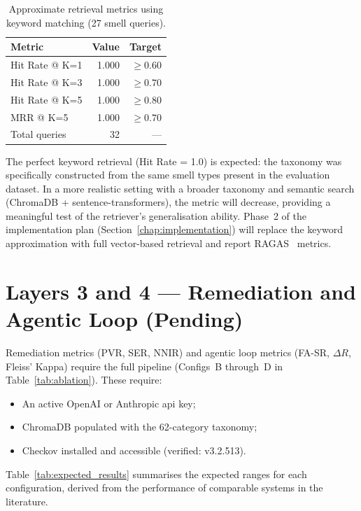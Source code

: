 \documentclass[12pt, a4paper]{report}
\begin{document}
\begin{table}[H]
  \centering
  \caption{Approximate retrieval metrics using keyword matching (27 smell queries).}
  \label{tab:retrieval}
  \begin{tabular}{lrr}
    \toprule
    \textbf{Metric} & \textbf{Value} & \textbf{Target} \\
    \midrule
    Hit Rate @ K=1 & 1.000 & $\geq 0.60$ \\
    Hit Rate @ K=3 & 1.000 & $\geq 0.70$ \\
    Hit Rate @ K=5 & 1.000 & $\geq 0.80$ \\
    MRR @ K=5      & 1.000 & $\geq 0.70$ \\
    Total queries  & 32    & --- \\
    \bottomrule
  \end{tabular}
\end{table}

The perfect keyword retrieval (Hit Rate = 1.0) is expected: the taxonomy was
specifically constructed from the same smell types present in the evaluation dataset.
In a more realistic setting with a broader taxonomy and semantic search (ChromaDB +
sentence-transformers), the metric will decrease, providing a meaningful test of the
retriever's generalisation ability. Phase~2 of the implementation plan
(Section~\ref{chap:implementation}) will replace the keyword approximation with full
vector-based retrieval and report RAGAS~\citep{es2024ragas} metrics.

\section{Layers 3 and 4 --- Remediation and Agentic Loop (Pending)}

Remediation metrics (PVR, SER, NNIR) and agentic loop metrics (FA-SR, $\Delta R$,
Fleiss' Kappa) require the full pipeline (Configs~B through~D in Table~\ref{tab:ablation}).
These require:
\begin{itemize}
  \item An active OpenAI or Anthropic \gls{api} key;
  \item ChromaDB populated with the 62-category taxonomy;
  \item Checkov installed and accessible (verified: v3.2.513).
\end{itemize}

Table~\ref{tab:expected_results} summarises the expected ranges for each configuration,
derived from the performance of comparable systems in the literature.
\end{document}
